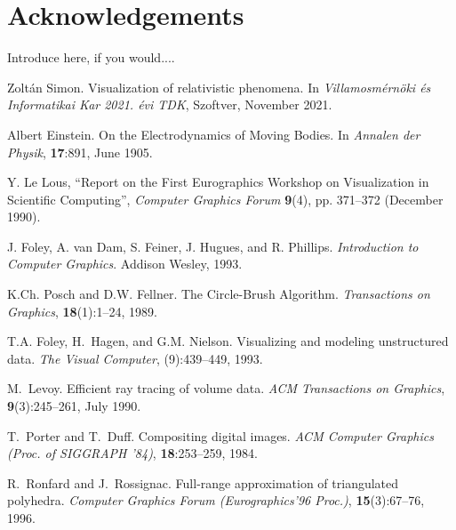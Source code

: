 \documentclass{egpubl}
\begin{document}
\section*{Acknowledgements}

Introduce here, if you would....


\begin{thebibliography}{1}


 Zoltán Simon.
\newblock Visualization of relativistic phenomena.
In \emph{Villamosmérnöki és Informatikai Kar 2021. évi TDK}, Szoftver, November 2021.

 Albert Einstein.
\newblock On the Electrodynamics of Moving Bodies.
In \emph{Annalen der Physik}, \textbf{17}:891, June 1905.


 Y. Le Lous,
``Report on the First Eurographics Workshop on Visualization in
Scientific Computing'', \emph{Computer Graphics Forum\/}
\textbf{9}(4), pp. 371--372 (December 1990).

J. Foley, A. van Dam, S. Feiner, J. Hugues, and R. Phillips.
\newblock \emph{Introduction to Computer Graphics}.
\newblock Addison Wesley, 1993.

K.Ch. Posch and D.W. Fellner.
\newblock The Circle-Brush Algorithm.
\newblock \emph{Transactions on Graphics}, \textbf{18}(1):1--24, 1989.

T.A. Foley, H.~Hagen, and G.M. Nielson.
\newblock Visualizing and modeling unstructured data.
\newblock \emph{The Visual Computer}, (9):439--449, 1993.

M.~Levoy.
\newblock Efficient ray tracing of volume data.
\newblock \emph{ACM Transactions on Graphics},
          \textbf{9}(3):245--261, July 1990.

T.~Porter and T.~Duff.
\newblock Compositing digital images.
\newblock \emph{ACM Computer Graphics (Proc. of SIGGRAPH '84)},
          \textbf{18}:253--259, 1984.

R.~Ronfard and J.~Rossignac.
\newblock Full-range approximation of triangulated polyhedra.
\newblock \emph{Computer Graphics Forum (Eurographics'96 Proc.)},
          \textbf{15}(3):67--76, 1996.

\end{thebibliography}
\end{document}
